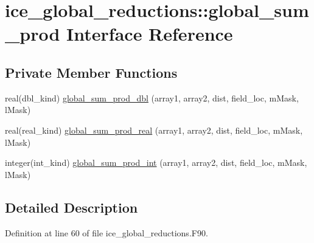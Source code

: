 \hypertarget{interfaceice__global__reductions_1_1global__sum__prod}{
\section{ice\_\-global\_\-reductions::global\_\-sum\_\-prod Interface Reference}
\label{interfaceice__global__reductions_1_1global__sum__prod}
}
\subsection*{Private Member Functions}
\begin{DoxyCompactItemize}
\item 
real(dbl\_\-kind) \hyperlink{interfaceice__global__reductions_1_1global__sum__prod_ad0ff33b868b9f2fb600754642e8866fd}{global\_\-sum\_\-prod\_\-dbl} (array1, array2, dist, field\_\-loc, mMask, lMask)
\item 
real(real\_\-kind) \hyperlink{interfaceice__global__reductions_1_1global__sum__prod_a3edc1bbd476b4ace75b3bbe1d6233629}{global\_\-sum\_\-prod\_\-real} (array1, array2, dist, field\_\-loc, mMask, lMask)
\item 
integer(int\_\-kind) \hyperlink{interfaceice__global__reductions_1_1global__sum__prod_a696fe1ce83431f8c0fa3782742ee2e26}{global\_\-sum\_\-prod\_\-int} (array1, array2, dist, field\_\-loc, mMask, lMask)
\end{DoxyCompactItemize}


\subsection{Detailed Description}


Definition at line 60 of file ice\_\-global\_\-reductions.F90.

